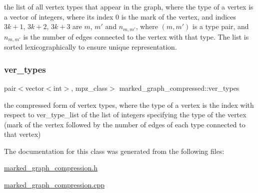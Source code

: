 the list of all vertex types that appear in the graph, where the type of a vertex is a vector of integers, where its index 0 is the mark of the vertex, and indices $3k+1$, $3k+2$, $3k+3$ are $m$, $m'$ and $n_{m,m'}$, where $(m,m')$ is a type pair, and $n_{m,m'}$ is the number of edges connected to the vertex with that type. The list is sorted lexicographically to ensure unique representation. 

\mbox{\label{classmarked__graph__compressed_af446cc5e23c241a92b76642fd5ebc403}} 
\subsubsection{\texorpdfstring{ver\+\_\+types}{ver\_types}}
{\footnotesize\ttfamily pair$<$vector$<$int$>$, mpz\+\_\+class$>$ marked\+\_\+graph\+\_\+compressed\+::ver\+\_\+types}



the compressed form of vertex types, where the type of a vertex is the index with respect to ver\+\_\+type\+\_\+list of the list of integers specifying the type of the vertex (mark of the vertex followed by the number of edges of each type connected to that vertex) 



The documentation for this class was generated from the following files\+:\begin{DoxyCompactItemize}
\item 
\hyperlink{marked__graph__compression_8h}{marked\+\_\+graph\+\_\+compression.\+h}\item 
\hyperlink{marked__graph__compression_8cpp}{marked\+\_\+graph\+\_\+compression.\+cpp}\end{DoxyCompactItemize}
